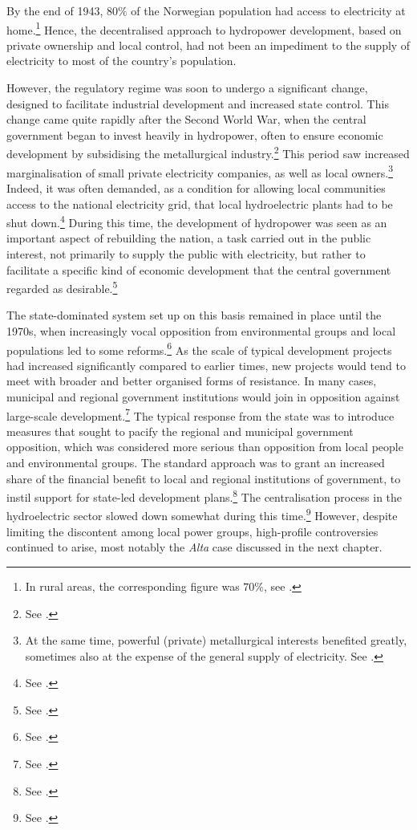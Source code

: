By the end of 1943, $80 \%$ of the Norwegian population had access to electricity at home.\footnote{In rural areas, the corresponding figure was $70 \%$, see \cite[7]{utbygd46}.} Hence, the decentralised approach to hydropower development, based on private ownership and local control, had not been an impediment to the supply of electricity to most of the country's population.

However, the regulatory regime was soon to undergo a significant change, designed to facilitate industrial development and increased state control. This change came quite rapidly after the Second World War, when the central government began to invest heavily in hydropower, often to ensure economic development by subsidising the metallurgical industry.\footnote{See \cite[59-65]{thue96}.} This period saw increased marginalisation of small private electricity companies, as well as local owners.\footnote{At the same time, powerful (private) metallurgical interests benefited greatly, sometimes also at the expense of the general supply of electricity. See \cite[65-71]{thue96}.} Indeed, it was often demanded, as a condition for allowing local communities access to the national electricity grid, that local hydroelectric  plants had to be shut down.\footnote{See \cite[p.111]{hindrum94}.} During this time, the development of hydropower was seen as an important aspect of rebuilding the nation, a task carried out in the public interest, not primarily to supply the public with electricity, but rather to facilitate a specific kind of economic development that the central government regarded as desirable.\footnote{See \cite[59]{thue96}.}

The state-dominated system set up on this basis remained in place until the 1970s, when increasingly vocal opposition from environmental groups and local populations led to some reforms.\footnote{See \cite[71-75]{thue96}.} As the scale of typical development projects had increased significantly compared to earlier times, new projects would tend to meet with broader and better organised forms of resistance. In many cases, municipal and regional government institutions would join in opposition against large-scale development.\footnote{See \cite[71-72]{thue96}.} The typical response from the state was to introduce measures that sought to pacify the regional and municipal government opposition, which was considered more serious than opposition from local people and environmental groups. The standard approach was to grant an increased share of the financial benefit to local and regional institutions of government, to instil support for state-led development plans.\footnote{See \cite[73-76]{nilsen08}.} The centralisation process in the hydroelectric sector slowed down somewhat during this time.\footnote{See \cite[85]{thue96}.} However, despite limiting the discontent among local power groups, high-profile controversies continued to arise, most notably the {\it Alta} case discussed in the next chapter.

